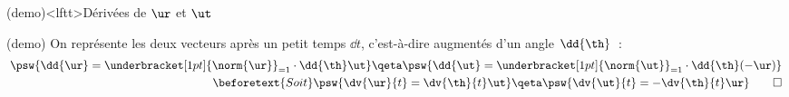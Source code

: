\documentclass[../../main/main.tex]{subfiles}
\begin{document}
\begin{tcb}[breakable](demo)<lftt>{Dérivées de $\protect\ur$ et $\protect\ut$}
	\begin{isd}[interior hidden, righthand ratio=.3](demo)
		On représente les deux vecteurs après un petit temps $\dd{t}$, c'est-à-dire
		augmentés d'un angle $\dd{\th}$~:
		\begin{align*}
			\psw{%
				\dd{\ur} = \underbracket[1pt]{\norm{\ur}}_{=1}\cdot \dd{\th} \ut
			}%
			\qeta
			\psw{%
				\dd{\ut} = \underbracket[1pt]{\norm{\ut}}_{=1}\cdot \dd{\th} (-\ur)
			}%
			\\\beforetext{Soit}
			\psw{%
				\dv{\ur}{t} = \dv{\th}{t}\ut
			}%
			\qeta
			\psw{%
				\dv{\ut}{t} = -\dv{\th}{t}\ur
			}%
			\qed
		\end{align*}
		\tcblower
		\begin{center}
\end{center}
\end{isd}
\end{tcb}
\end{document}
